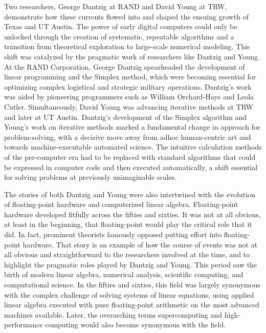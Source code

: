 Two researchers, George Dantzig at RAND and David Young at TRW, demonstrate how these currents flowed into and shaped the ensuing growth of Texas and UT Austin. The power of early digital computers could only be unlocked through the creation of systematic, repeatable algorithms and a transition from theoretical exploration to large-scale numerical modeling. This shift was catalyzed by the pragmatic work of researchers like Dantzig and Young. At the RAND Corporation, George Dantzig spearheaded the development of linear programming and the Simplex method, which were becoming essential for optimizing complex logistical and strategic military operations. Dantzig's work was aided by pioneering programmers such as William Orchard-Hays and Leola Cutler. Simultaneously, David Young was advancing iterative methods at TRW and later at UT Austin. Dantzig’s development of the Simplex algorithm and Young’s work on iterative methods marked a fundamental change in approach for problem-solving, with a decisive move away from adhoc human-centric art and towards machine-executable automated science. The intuitive calculation methods of the pre-computer era had to be replaced with standard algorithms that could be expressed in computer code and then executed automatically, a shift essential for solving problems at previously unimaginable scales. 

The stories of both Dantzig and Young were also intertwined with the evolution of floating-point hardware and computerized linear algebra. Floating-point hardware developed fitfully across the fifties and sixties. It was not at all obvious, at least in the beginning, that floating-point would play the critical role that it did. In fact, prominent theorists famously opposed putting effort into floating-point hardware. That story is an example of how the course of events was not at all obvious and straightforward to the researchers involved at the time, and to highlight the pragmatic roles played by Dantzig and Young. This period saw the birth of modern linear algebra, numerical analysis, scientific computing, and computational science. In the fifties and sixties, this field was largely synonymous with the complex challenge of solving systems of linear equations, using applied linear algebra executed with pure floating-point arithmetic on the most advanced machines available. Later, the overarching terms supercomputing and high-performance computing would also become synonymous with the field.

